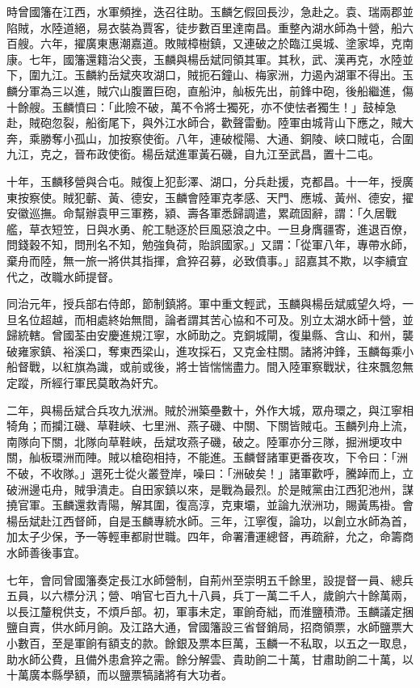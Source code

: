 \begin{pinyinscope}
時曾國籓在江西，水軍頻挫，迭召往助。玉麟乞假回長沙，急赴之。袁、瑞兩郡並陷賊，水陸道絕，易衣裝為賈客，徒步數百里達南昌。重整內湖水師為十營，船六百艘。六年，擢廣東惠潮嘉道。敗賊樟樹鎮，又連破之於臨江吳城、塗家埠，克南康。七年，國籓還籍治父喪，玉麟與楊岳斌同領其軍。其秋，武、漢再克，水陸並下，圍九江。玉麟約岳斌夾攻湖口，賊扼石鐘山、梅家洲，力遏內湖軍不得出。玉麟分軍為三以進，賊穴山腹置巨砲，直船沖，舢板先出，前鋒中砲，後船繼進，傷十餘艘。玉麟憤曰：「此險不破，萬不令將士獨死，亦不使怯者獨生！」鼓棹急赴，賊砲忽裂，船銜尾下，與外江水師合，歡聲雷動。陸軍由城背山下應之，賊大奔，乘勝奪小孤山，加按察使銜。八年，連破樅陽、大通、銅陵、峽口賊屯，合圍九江，克之，晉布政使銜。楊岳斌進軍黃石磯，自九江至武昌，置十二屯。

十年，玉麟移營與合屯。賊復上犯彭澤、湖口，分兵赴援，克都昌。十一年，授廣東按察使。賊犯蘄、黃、德安，玉麟會陸軍克孝感、天門、應城、黃州、德安，擢安徽巡撫。命幫辦袁甲三軍務，潁、壽各軍悉歸調遣，累疏固辭，謂：「久居戰艦，草衣短笠，日與水勇、舵工馳逐於巨風惡浪之中。一旦身膺疆寄，進退百僚，問錢穀不知，問刑名不知，勉強負荷，貽誤國家。」又謂：「從軍八年，專帶水師，棄舟而陸，無一旅一將供其指揮，倉猝召募，必致僨事。」詔嘉其不欺，以李續宜代之，改職水師提督。

同治元年，授兵部右侍郎，節制鎮將。軍中重文輕武，玉麟與楊岳斌威望久埒，一旦名位超越，而相處終始無間，論者謂其苦心協和不可及。別立太湖水師十營，並歸統轄。曾國荃由安慶進規江寧，水師助之。克銅城閘，復巢縣、含山、和州，襲破雍家鎮、裕溪口，奪東西梁山，進攻採石，又克金柱關。諸將沖鋒，玉麟每乘小船督戰，以紅旗為識，或前或後，將士皆惴惴盡力。間入陸軍察戰狀，往來飄忽無定蹤，所經行軍民莫敢為奸宄。

二年，與楊岳斌合兵攻九洑洲。賊於洲築壘數十，外作大城，眾舟環之，與江寧相犄角；而攔江磯、草鞋峽、七里洲、燕子磯、中關、下關皆賊屯。玉麟列舟上流，南隊向下關，北隊向草鞋峽，岳斌攻燕子磯，破之。陸軍亦分三隊，掘洲埂攻中關，舢板環洲而陣。賊以槍砲相持，不能進。玉麟督諸軍更番夜攻，下令曰：「洲不破，不收隊。」選死士從火叢登岸，噪曰：「洲破矣！」諸軍歡呼，騰踔而上，立破洲邊屯舟，賊爭潰走。自田家鎮以來，是戰為最烈。於是賊黨由江西犯池州，謀撓官軍。玉麟還救青陽，解其圍，復高淳，克東壩，並論九洑洲功，賜黃馬褂。會楊岳斌赴江西督師，自是玉麟專統水師。三年，江寧復，論功，以創立水師為首，加太子少保，予一等輕車都尉世職。四年，命署漕運總督，再疏辭，允之，命籌商水師善後事宜。

七年，會同曾國籓奏定長江水師營制，自荊州至崇明五千餘里，設提督一員、總兵五員，以六標分汛；營、哨官七百九十八員，兵丁一萬二千人，歲餉六十餘萬兩，以長江釐稅供支，不煩戶部。初，軍事未定，軍餉奇絀，而淮鹽積滯。玉麟議定捆鹽自賣，供水師月餉。及江路大通，曾國籓設三省督銷局，招商領票，水師鹽票大小數百，至是軍餉有額支的款。餘銀及票本巨萬，玉麟一不私取，以五之一取息，助水師公費，且備外患倉猝之需。餘分解雲、貴助餉二十萬，甘肅助餉二十萬，以十萬廣本縣學額，而以鹽票犒諸將有大功者。


\end{pinyinscope}
